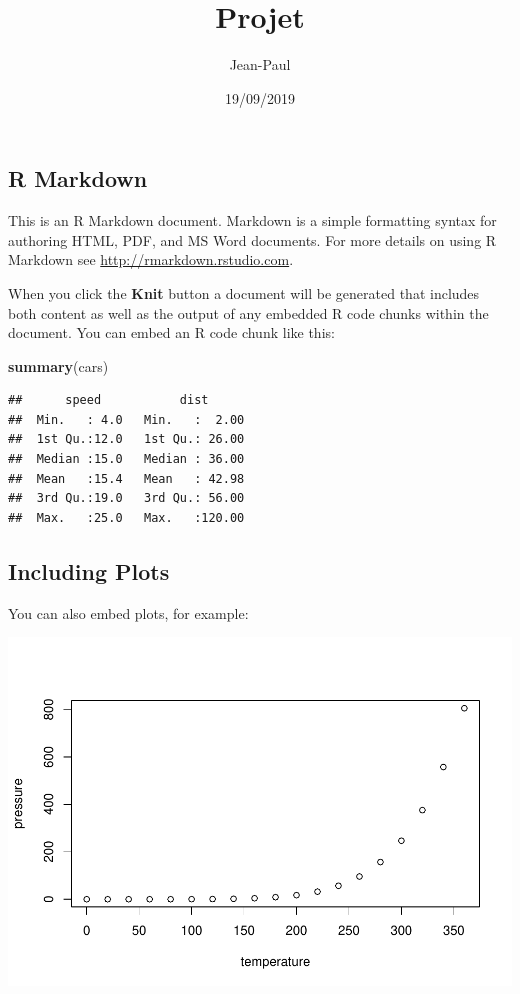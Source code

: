 \documentclass[]{article}
\title{Projet}
\author{Jean-Paul}
\date{19/09/2019}
\newenvironment{Shaded}{\begin{snugshade}}{\end{snugshade}}
\newcommand{\KeywordTok}[1]{\textcolor[rgb]{0.13,0.29,0.53}{\textbf{#1}}}
\newcommand{\NormalTok}[1]{#1}
\begin{document}
\maketitle

\hypertarget{r-markdown}{%
\subsection{R Markdown}\label{r-markdown}}

This is an R Markdown document. Markdown is a simple formatting syntax
for authoring HTML, PDF, and MS Word documents. For more details on
using R Markdown see \url{http://rmarkdown.rstudio.com}.

When you click the \textbf{Knit} button a document will be generated
that includes both content as well as the output of any embedded R code
chunks within the document. You can embed an R code chunk like this:

\begin{Shaded}
\begin{Highlighting}[]
\KeywordTok{summary}\NormalTok{(cars)}
\end{Highlighting}
\end{Shaded}

\begin{verbatim}
##      speed           dist       
##  Min.   : 4.0   Min.   :  2.00  
##  1st Qu.:12.0   1st Qu.: 26.00  
##  Median :15.0   Median : 36.00  
##  Mean   :15.4   Mean   : 42.98  
##  3rd Qu.:19.0   3rd Qu.: 56.00  
##  Max.   :25.0   Max.   :120.00
\end{verbatim}

\hypertarget{including-plots}{%
\subsection{Including Plots}\label{including-plots}}

You can also embed plots, for example:

\includegraphics{projet_files/figure-latex/pressure-1.pdf}
\end{document}
